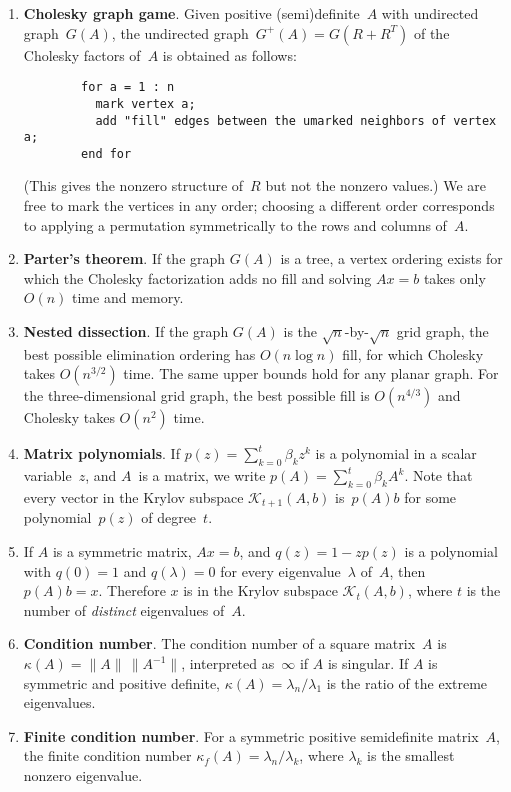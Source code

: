\documentclass[11pt]{article}
\newcommand{\krylov}{\mathcal{K}}   %
\begin{document}
\begin{enumerate}
\item{\bf Cholesky graph game}.
Given positive (semi)definite~$A$ with undirected graph~$G(A)$,
the undirected graph~$G^+(A)=G(R+R^T)$ of the Cholesky factors
of~$A$ is obtained as follows:
\begin{verbatim}
        for a = 1 : n
          mark vertex a;
          add "fill" edges between the umarked neighbors of vertex a;
        end for
\end{verbatim}
(This gives the nonzero structure of~$R$ but not the nonzero values.)
We are free to mark the vertices in any order;
choosing a different order corresponds to applying a
permutation symmetrically to the rows and columns of~$A$.

\item{\bf Parter's theorem}.
If the graph $G(A)$ is a tree, a vertex ordering exists for
which the Cholesky factorization adds no fill and solving
$Ax=b$ takes only $O(n)$ time and memory.

\item{\bf Nested dissection}.
If the graph $G(A)$ is the $\sqrt{n}$-by-$\sqrt{n}$ grid graph,
the best possible elimination ordering has $O(n\log n)$ fill,
for which Cholesky takes $O(n^{3/2})$ time.
The same upper bounds hold for any planar graph.
For the three-dimensional grid graph, the best possible
fill is $O(n^{4/3})$ and Cholesky takes $O(n^2)$ time.

\item{\bf Matrix polynomials}.
If $p(z) = \sum_{k=0}^t \beta_kz^k$ is a polynomial in a 
scalar variable~$z$, and $A$~is a matrix,
we write $p(A) = \sum_{k=0}^t \beta_kA^k$.
Note that every vector in the Krylov subspace $\krylov_{t+1}(A,b)$
is~$p(A)b$ for some polynomial~$p(z)$ of degree~$t$.

\item
If $A$ is a symmetric matrix, $Ax=b$, 
and $q(z) = 1 - zp(z)$ is a polynomial with
$q(0)=1$ and $q(\lambda)=0$ for every eigenvalue~$\lambda$ of~$A$,
then $p(A)b = x$.
Therefore $x$ is in the Krylov subspace $\krylov_{t}(A,b)$, 
where $t$ is the number of {\em distinct} eigenvalues of~$A$.

\item{\bf Condition number}.
The condition number of a square matrix~$A$ is 
$\kappa(A)=\|A\|\,\|A^{-1}\|$, interpreted as~$\infty$
if $A$ is singular.  If $A$ is symmetric and positive 
definite, $\kappa(A) = \lambda_n/\lambda_1$ is the ratio
of the extreme eigenvalues.

\item{\bf Finite condition number}.
For a symmetric positive semidefinite matrix~$A$,
the finite condition number
$\kappa_f(A)=\lambda_n/\lambda_k$, where $\lambda_k$ is
the smallest nonzero eigenvalue.


\end{enumerate}
\end{document}
